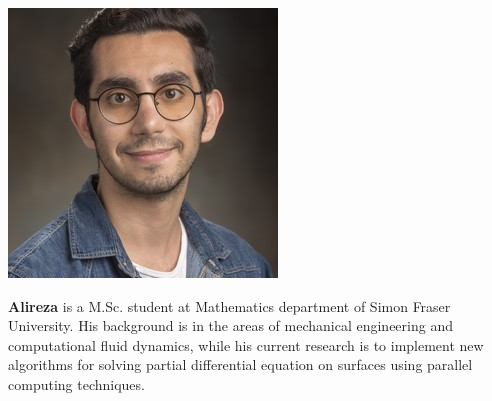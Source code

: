 \documentclass{beamer}
\begin{document}
\begin{frame}
\vspace{10pt}
\begin{minipage}[c]{0.15\textwidth}
\includegraphics[width=\textwidth, trim={30pt 0pt 30pt 0pt}, clip]{TeamPics/alireza.jpg}
\end{minipage}\hspace{0.05\textwidth}%
\begin{minipage}[c]{0.8\textwidth}
{\small \textbf{Alireza} is a M.Sc. student at Mathematics department of Simon Fraser University. His background is in the areas of mechanical engineering and computational fluid dynamics, while his current research is to implement new algorithms for solving partial differential equation on surfaces using parallel computing techniques. }
\end{minipage}



\end{frame}
\end{document}
